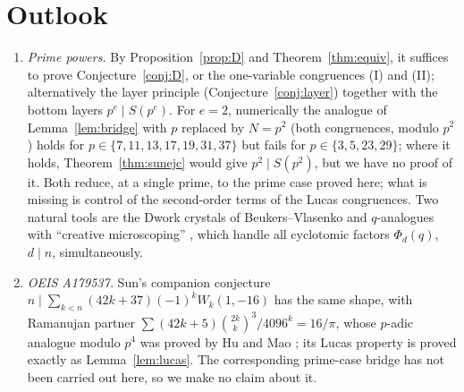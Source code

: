 \documentclass[11pt]{amsart}
\theoremstyle{definition}
\begin{document}
\section{Outlook}\label{sec:outlook}
\begin{enumerate}[label=(\alph*)]
\item \emph{Prime powers.} By Proposition~\ref{prop:D} and Theorem~\ref{thm:equiv}, it suffices to
prove Conjecture~\ref{conj:D}, or the one-variable congruences (I) and (II); alternatively the layer
principle (Conjecture~\ref{conj:layer}) together with the bottom layers $p^e\mid S(p^e)$. For $e=2$,
numerically the analogue of Lemma~\ref{lem:bridge} with $p$ replaced by $N=p^2$ (both congruences,
modulo $p^2$) holds for $p\in\{7,11,13,17,19,31,37\}$ but fails for $p\in\{3,5,23,29\}$; where it
holds, Theorem~\ref{thm:sunejc} would give $p^2\mid S(p^2)$, but we have no proof of it. Both reduce, at a
single prime, to the prime case proved here; what is missing is control of the second-order terms
of the Lucas congruences. Two natural tools are the Dwork crystals of Beukers--Vlasenko
\cite{BV1,BV3} and $q$-analogues with ``creative microscoping'' \cite{GZm}, which handle all
cyclotomic factors $\Phi_d(q)$, $d\mid n$, simultaneously.
\item \emph{OEIS A179537.} Sun's companion conjecture $n\mid\sum_{k<n}(42k+37)(-1)^kW_k(1,-16)$
has the same shape, with Ramanujan partner $\sum(42k+5)\binom{2k}k^3/4096^k=16/\pi$, whose
$p$-adic analogue modulo $p^4$ was proved by Hu and Mao \cite{HM}; its Lucas
property is proved exactly as Lemma~\ref{lem:lucas}. The corresponding prime-case bridge has not
been carried out here, so we make no claim about it.
\end{enumerate}
\end{document}
